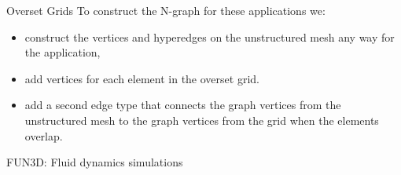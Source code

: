 \documentclass{beamer}
\begin{document}
\begin{textblock}{15.6}
\begin{textblock}{5}
\begin{block}{Overset Grids}
            To construct the N-graph for these applications we:
            \begin{itemize}
            \item construct the vertices and hyperedges on the unstructured mesh any way for the application,
            \item add vertices for each element in the overset grid.
            \item add a second edge type that connects the graph vertices from the unstructured mesh to the graph vertices from the grid when the elements overlap.
            \end{itemize}

            
          \end{block}
          
          \begin{block}{FUN3D: Fluid dynamics simulations}
            
          \end{block}
        \end{textblock}
      \end{textblock}
\end{document}
